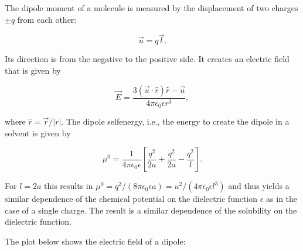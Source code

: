 \documentclass[letterpaper,10pt,english]{sphinxmanual}
\begin{document}
\sphinxAtStartPar
The dipole moment of a molecule is measured by the displacement of two charges \(±q\) from each other:

\sphinxAtStartPar
\begin{equation}
\vec{u}=q\vec{l}.
\end{equation}

\sphinxAtStartPar
Its direction is from the negative to the positive side. It creates an electric field that is given by

\sphinxAtStartPar
\begin{equation}
\vec{E}=\frac{3(\vec{u}\cdot \hat{r})\hat{r}-\vec{u}}{4\pi \epsilon_{0}\epsilon r^{3}},
\end{equation}

\sphinxAtStartPar
where \(\hat{r}=\vec{r}/|r|\). The dipole self\sphinxhyphen{}energy, i.e., the energy to create the dipole in a solvent is given by

\sphinxAtStartPar
\begin{equation}
\mu^{0}=\frac{1}{4\pi \epsilon_{0}\epsilon}\left [ \frac{q^2}{2a}+\frac{q^2}{2a}-\frac{q^2}{l}\right ].
\end{equation}

\sphinxAtStartPar
For \(l=2a\) this results in \(\mu^0=q^2/(8\pi\epsilon_0 \epsilon a)=u^2/(4\pi\epsilon_0 \epsilon l^3 )\) and thus yields a similar dependence of the chemical potential on the dielectric function \(\epsilon\) as in the case of a single charge. The result is a similar dependence of the solubility on the dielectric function.

\sphinxAtStartPar
The plot below shows the electric field of a dipole:
\end{document}

